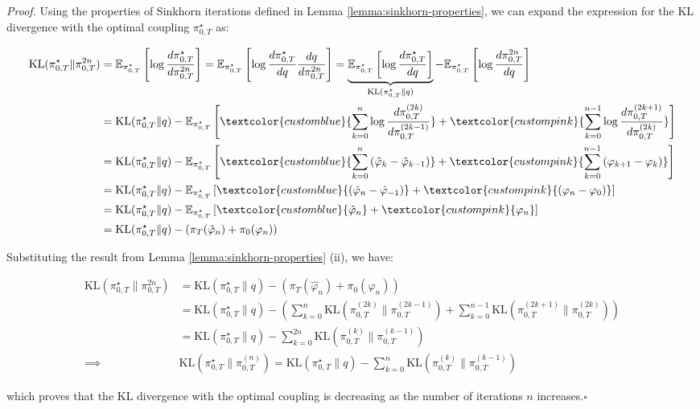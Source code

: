 \documentclass{article}
\newcommand{\bluetext}[1]{\textcolor{customblue}{#1}}
\newcommand{\pinktext}[1]{\textcolor{custompink}{#1}}
\begin{document}
\textit{Proof.} Using the properties of Sinkhorn iterations defined in Lemma \ref{lemma:sinkhorn-properties}, we can expand the expression for the KL divergence with the optimal coupling $\pi^\star_{0,T}$ as:
\begin{small}
\begin{align}
    \text{KL}(\pi^\star_{0,T}\|\pi^{2n}_{0,T})&=\mathbb{E}_{\pi^\star_{0,T}}\left[\log \frac{d\pi^\star_{0,T}}{d\pi^{2n}_{0,T}}\right]=\mathbb{E}_{\pi^\star_{0,T}}\left[\log \frac{d\pi^\star_{0,T}}{dq}\frac{dq}{d\pi^{2n}_{0,T}}\right]=\underbrace{\mathbb{E}_{\pi^\star_{0,T}}\left[\log \frac{d\pi^\star_{0,T}}{dq}\right]}_{\text{KL}(\pi^\star_{0,T}\|q)}-\mathbb{E}_{\pi^\star_{0,T}}\left[\log \frac{d\pi^{2n}_{0,T}}{dq}\right]\nonumber\\
    &=\text{KL}(\pi^\star_{0,T}\|q)-\mathbb{E}_{\pi^\star_{0,T}}\left[\bluetext{\sum_{k=0}^n\log \frac{d\pi^{(2k)}_{0,T}}{d\pi^{(2k-1)}_{0,T}}}+\pinktext{\sum_{k=0}^{n-1}\log \frac{d\pi^{(2k+1)}_{0,T}}{d\pi^{(2k)}_{0,T}}}\right]\nonumber\\
    &=\text{KL}(\pi^\star_{0,T}\|q)-\mathbb{E}_{\pi^\star_{0,T}}\left[\bluetext{\sum_{k=0}^n \left(\hat{\varphi}_k-\hat{\varphi}_{k-1}\right)}+\pinktext{\sum_{k=0}^{n-1}\left(\varphi_{k+1}-\varphi_k\right) }\right]\nonumber\\
    &=\text{KL}(\pi^\star_{0,T}\|q)-\mathbb{E}_{\pi^\star_{0,T}}\left[\bluetext{ \left(\hat{\varphi}_n-\hat{\varphi}_{-1}\right)}+\pinktext{\left(\varphi_{n}-\varphi_0\right) }\right]\nonumber\\
    &=\text{KL}(\pi^\star_{0,T}\|q)-\mathbb{E}_{\pi^\star_{0,T}}\left[\bluetext{\hat{\varphi}_n}+\pinktext{\varphi_{n} }\right]\nonumber\\
    &=\text{KL}(\pi^\star_{0,T}\|q)-\left(\pi_T(\hat\varphi_n)+\pi_0(\varphi_n)\right)
\end{align}
\end{small}
Substituting the result from Lemma \ref{lemma:sinkhorn-properties} (ii), we have:
\begin{small}
\begin{align}
    \text{KL}(\pi^\star_{0,T}\|\pi^{2n}_{0,T})&=\text{KL}(\pi^\star_{0,T}\|q)-\left(\pi_T(\hat\varphi_n)+\pi_0(\varphi_n)\right)\nonumber\\
    &=\text{KL}(\pi^\star_{0,T}\|q)-\left(\sum_{k=0}^{n}\text{KL}\left(\pi_{0,T}^{(2k)}\|\pi_{0,T}^{(2k-1)}\right)+\sum_{k=0}^{n-1}\text{KL}\left(\pi_{0,T}^{(2k+1)}\|\pi_{0,T}^{(2k)}\right)\right)\nonumber\\
    &=\text{KL}(\pi^\star_{0,T}\|q)-\sum_{k=0}^{2n}\text{KL}\left(\pi_{0,T}^{(k)}\|\pi_{0,T}^{(k-1)}\right)\nonumber\\
    \implies &\boxed{\text{KL}(\pi^\star_{0,T}\|\pi^{(n)}_{0,T})=\text{KL}(\pi^\star_{0,T}\|q)-\sum_{k=0}^{n}\text{KL}\left(\pi_{0,T}^{(k)}\|\pi_{0,T}^{(k-1)}\right)}
\end{align}
\end{small}
which proves that the KL divergence with the optimal coupling is decreasing as the number of iterations $n$ increases.\hfill $\square$
\end{document}
